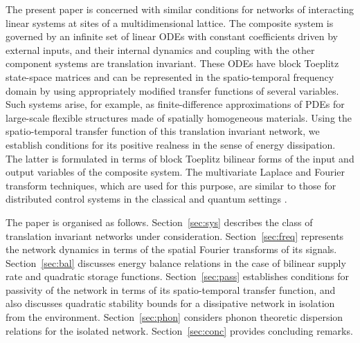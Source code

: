\documentclass[letterpaper, 10pt, conference]{ieeeconf}  %
\begin{document}
The present paper is concerned with similar conditions for networks of interacting linear systems at sites of a multidimensional lattice. The composite system is governed by an infinite set of linear ODEs with constant coefficients driven by external inputs, and their internal dynamics and coupling with the other component systems are translation invariant. These ODEs have block Toeplitz state-space matrices and can be represented in the spatio-temporal frequency domain by using appropriately modified transfer functions of several variables.
Such systems arise, for example, as finite-difference approximations of PDEs for large-scale flexible structures made of spatially homogeneous materials. Using the spatio-temporal transfer function of this translation invariant network, we establish conditions for its positive realness in the sense of energy dissipation. The latter is formulated in terms of block Toeplitz bilinear forms of the input and output variables of the composite system. The multivariate  Laplace and Fourier  transform techniques, which are used for this purpose, are similar to those for distributed control systems in the classical and quantum settings \cite{SVP_2015,VP_2014}.

The paper is organised as follows.
Section~\ref{sec:sys} describes the class of translation invariant networks under consideration.
Section~\ref{sec:freq} represents the network dynamics in terms of the spatial Fourier transforms of its signals.
Section~\ref{sec:bal} discusses energy balance relations in the case of bilinear supply rate and quadratic storage functions.
Section~\ref{sec:pass} establishes conditions for passivity of the network in terms of its spatio-temporal transfer function, and also discusses quadratic stability bounds for a dissipative network in isolation from the environment.
Section~\ref{sec:phon} considers phonon theoretic dispersion relations for the isolated network.
Section~\ref{sec:conc} provides concluding remarks.

\end{document}
